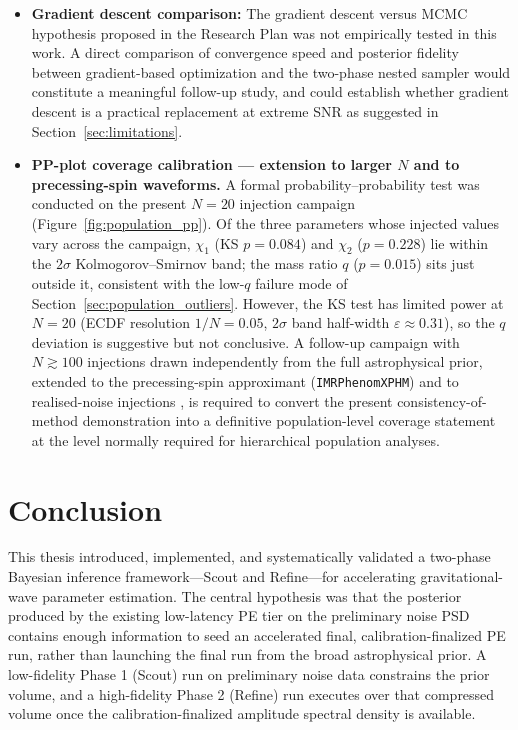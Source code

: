 \documentclass[12pt]{article}
\begin{document}
\begin{itemize}
    \item \textbf{Gradient descent comparison:} The gradient descent versus MCMC hypothesis proposed in the Research Plan was not empirically tested in this work. A direct comparison of convergence speed and posterior fidelity between gradient-based optimization and the two-phase nested sampler would constitute a meaningful follow-up study, and could establish whether gradient descent is a practical replacement at extreme SNR as suggested in Section~\ref{sec:limitations}.

    \item \textbf{PP-plot coverage calibration --- extension to larger $N$ and to precessing-spin waveforms.} A formal probability--probability test was conducted on the present $N=20$ injection campaign (Figure~\ref{fig:population_pp}). Of the three parameters whose injected values vary across the campaign, $\chi_1$ (KS $p = 0.084$) and $\chi_2$ ($p = 0.228$) lie within the $2\sigma$ Kolmogorov--Smirnov band; the mass ratio $q$ ($p = 0.015$) sits just outside it, consistent with the low-$q$ failure mode of Section~\ref{sec:population_outliers}. However, the KS test has limited power at $N=20$ (ECDF resolution $1/N = 0.05$, $2\sigma$ band half-width $\varepsilon \approx 0.31$), so the $q$ deviation is suggestive but not conclusive. A follow-up campaign with $N \gtrsim 100$ injections drawn independently from the full astrophysical prior, extended to the precessing-spin approximant (\texttt{IMRPhenomXPHM}) and to realised-noise injections \citep{Cook2006,Veitch2015}, is required to convert the present consistency-of-method demonstration into a definitive population-level coverage statement at the level normally required for hierarchical population analyses.
\end{itemize}

\section{Conclusion}
\label{sec:conclusion}

This thesis introduced, implemented, and systematically validated a two-phase Bayesian inference framework---Scout and Refine---for accelerating gravitational-wave parameter estimation. The central hypothesis was that the posterior produced by the existing low-latency PE tier on the preliminary noise PSD contains enough information to seed an accelerated final, calibration-finalized PE run, rather than launching the final run from the broad astrophysical prior. A low-fidelity Phase 1 (Scout) run on preliminary noise data constrains the prior volume, and a high-fidelity Phase 2 (Refine) run executes over that compressed volume once the calibration-finalized amplitude spectral density is available.
\end{document}
